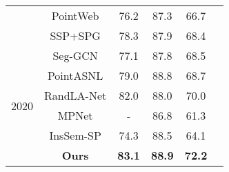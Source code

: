 \documentclass[10pt,twocolumn,letterpaper]{article}
\begin{document}
\begin{itemize}
\begin{table}
\begin{center}
{\begin{tabular}{|c|c|c c |c|c|}
&PointWeb \cite{zhao2019pointweb}    & 76.2 & 87.3 & 66.7  \\
&SSP+SPG \cite{landrieu2019point}     & 78.3 & 87.9 & 68.4  \\\hline
\multirow{6}{*}{2020}
&Seg-GCN \cite{lei2020seggcn}     & 77.1 & 87.8 & 68.5  \\
&PointASNL \cite{yan2020pointasnl}   & 79.0 &88.8 & 68.7  \\
&RandLA-Net \cite{hu2020randla}      & 82.0 & 88.0 & 70.0        \\
&MPNet \cite{he2020learning}      & - & 86.8 & 61.3        \\
&InsSem-SP \cite{liu2020self}     & 74.3 & 88.5 & 64.1        \\
 \cline{2-5} 
&\textbf{Ours}  & \textbf{83.1} & \textbf{88.9} & \textbf{72.2}  \\ \hline
\end{tabular}
\label{tab:s3dis}
}
\end{center}
\vspace{-5mm}
\end{table}


\end{itemize}
\end{document}
